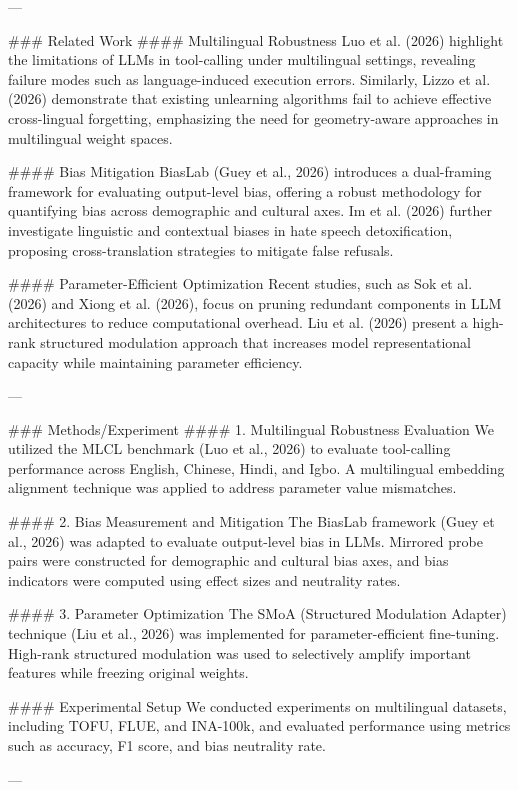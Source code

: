 ---

### Related Work
#### Multilingual Robustness
Luo et al. (2026) highlight the limitations of LLMs in tool-calling under multilingual settings, revealing failure modes such as language-induced execution errors. Similarly, Lizzo et al. (2026) demonstrate that existing unlearning algorithms fail to achieve effective cross-lingual forgetting, emphasizing the need for geometry-aware approaches in multilingual weight spaces.

#### Bias Mitigation
BiasLab (Guey et al., 2026) introduces a dual-framing framework for evaluating output-level bias, offering a robust methodology for quantifying bias across demographic and cultural axes. Im et al. (2026) further investigate linguistic and contextual biases in hate speech detoxification, proposing cross-translation strategies to mitigate false refusals.

#### Parameter-Efficient Optimization
Recent studies, such as Sok et al. (2026) and Xiong et al. (2026), focus on pruning redundant components in LLM architectures to reduce computational overhead. Liu et al. (2026) present a high-rank structured modulation approach that increases model representational capacity while maintaining parameter efficiency.

---

### Methods/Experiment
#### 1. Multilingual Robustness Evaluation
We utilized the MLCL benchmark (Luo et al., 2026) to evaluate tool-calling performance across English, Chinese, Hindi, and Igbo. A multilingual embedding alignment technique was applied to address parameter value mismatches.

#### 2. Bias Measurement and Mitigation
The BiasLab framework (Guey et al., 2026) was adapted to evaluate output-level bias in LLMs. Mirrored probe pairs were constructed for demographic and cultural bias axes, and bias indicators were computed using effect sizes and neutrality rates.

#### 3. Parameter Optimization
The SMoA (Structured Modulation Adapter) technique (Liu et al., 2026) was implemented for parameter-efficient fine-tuning. High-rank structured modulation was used to selectively amplify important features while freezing original weights.

#### Experimental Setup
We conducted experiments on multilingual datasets, including TOFU, FLUE, and INA-100k, and evaluated performance using metrics such as accuracy, F1 score, and bias neutrality rate.

---

